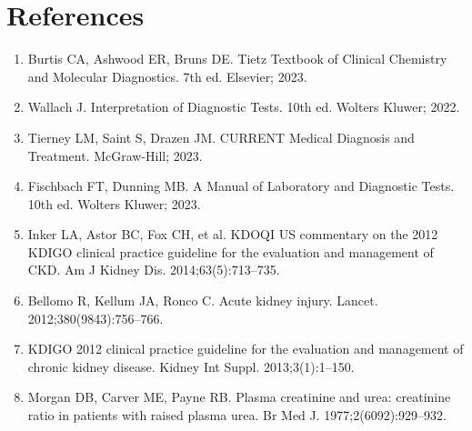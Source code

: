 \section*{References}
\begin{enumerate}
  \item Burtis CA, Ashwood ER, Bruns DE. Tietz Textbook of Clinical Chemistry and Molecular Diagnostics. 7th ed. Elsevier; 2023.
  \item Wallach J. Interpretation of Diagnostic Tests. 10th ed. Wolters Kluwer; 2022.
  \item Tierney LM, Saint S, Drazen JM. CURRENT Medical Diagnosis and Treatment. McGraw-Hill; 2023.
  \item Fischbach FT, Dunning MB. A Manual of Laboratory and Diagnostic Tests. 10th ed. Wolters Kluwer; 2023.
  \item Inker LA, Astor BC, Fox CH, et al. KDOQI US commentary on the 2012 KDIGO clinical practice guideline for the evaluation and management of CKD. Am J Kidney Dis. 2014;63(5):713--735.
  \item Bellomo R, Kellum JA, Ronco C. Acute kidney injury. Lancet. 2012;380(9843):756--766.
  \item KDIGO 2012 clinical practice guideline for the evaluation and management of chronic kidney disease. Kidney Int Suppl. 2013;3(1):1--150.
  \item Morgan DB, Carver ME, Payne RB. Plasma creatinine and urea: creatinine ratio in patients with raised plasma urea. Br Med J. 1977;2(6092):929--932.
\end{enumerate}

\clearpage

